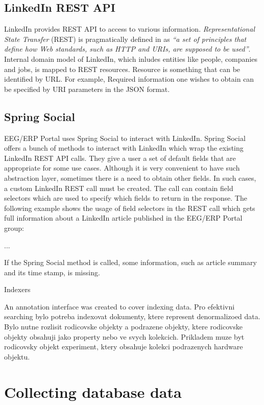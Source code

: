 \documentclass[12pt, oneside, a4paper]{book}
\begin{document}
\subsection{LinkedIn REST API}

LinkedIn provides REST API to access to various information. \textit{Representational State Transfer} (REST) is pragmatically defined in \cite{REST:Introduction} as \textit{``a set of principles that define how Web standards, such as HTTP and URIs, are supposed to be used''}.
Internal domain model of LinkedIn, which inludes entities like people, companies and jobs, is mapped to REST resources. Resource is something that can be identified by URL. For example, 	
Required information one wishes to obtain can be specified by URI parameters in the JSON format. 

\subsection{Spring Social}

EEG/ERP Portal uses Spring Social to interact with LinkedIn. 
Spring Social offers a bunch of methods to interact with LinkedIn which wrap the existing LinkedIn REST API calls. 
They give a user a set of default fields that are appropriate for some use cases. 
Although it is very convenient to have such abstraction layer, sometimes there is a need to obtain other fields. 
In such cases, a custom LinkedIn REST call must be created.
The call can contain field selectors which are used to specify which fields to return in the response.
The following example shows the usage of field selectors in the REST call which gets full information about a LinkedIn article published in the EEG/ERP Portal group:

...

If the Spring Social method is called, some information, such as article summary and its time stamp, is missing. 



Indexers

An annotation interface was created to cover indexing data. 
Pro efektivni
searching bylo potreba indexovat dokumenty, ktere represent
denormalizoed data. Bylo nutne rozlisit rodicovske objekty a
podrazene objekty, ktere rodicovske objekty obsahuji jako
property nebo ve svych kolekcich. Prikladem muze byt rodicovsky
objekt experiment, ktery obsahuje kolekci podrazenych hardware
objektu.


\section{Collecting database data}
\end{document}
